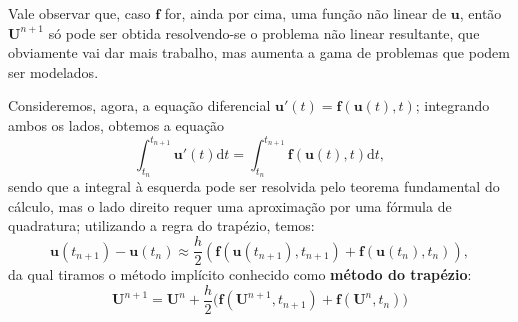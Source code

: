 \documentclass[../differential_methods.tex]{subfiles}
\begin{document}
Vale observar que, caso \(\mathbf{f}\) for, ainda por cima, uma função não linear de \(\mathbf{u}\), então \(\mathbf{U}^{n+1}\) só pode ser obtida resolvendo-se o problema não linear resultante, que obviamente vai dar mais trabalho, mas aumenta a gama de problemas que podem ser modelados.

Consideremos, agora, a equação diferencial \(\mathbf{u}'(t)=\mathbf{f}(\mathbf{u}(t), t)\); integrando ambos os lados, obtemos a equação
\[
	\int_{t_{n}}^{t_{n+1}}\mathbf{u}'(t) \mathrm{d}t = \int_{t_{n}}^{t_{n+1}}\mathbf{f}(\mathbf{u}(t), t) \mathrm{d}t,
\]
sendo que a integral à esquerda pode ser resolvida pelo teorema fundamental do cálculo, mas o lado direito requer uma aproximação por uma fórmula de quadratura; utilizando a regra do trapézio, temos:
\[
	\mathbf{u}(t_{n+1})-\mathbf{u}(t_{n})\approx \frac{h}{2}(\mathbf{f}(\mathbf{u}(t_{n+1}), t_{n+1}) + \mathbf{f}(\mathbf{u}(t_{n}), t_{n})),
\]
da qual tiramos o método implícito conhecido como \textbf{método do trapézio}:
\[
	\boxed{\mathbf{U}^{n+1}= \mathbf{U}^{n}+ \frac{h}{2}\biggl(\mathbf{f}(\mathbf{U}^{n+1}, t_{n+1}) + \mathbf{f}(\mathbf{U}^{n}, t_{n})\biggr)}
\]
\end{document}
